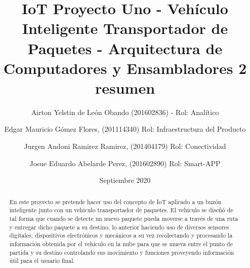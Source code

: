 \documentclass[osajnl,twocolumn,showpacs,superscriptaddress,10pt]{revtex4-1}
\begin{document}

\title{\Huge IoT Proyecto Uno -  Vehículo Inteligente Transportador de Paquetes  - Arquitectura de Computadores y Ensambladores 2 }

\author{\newline Airton Yelstin de León Obando (201602836) - Rol: Analítico}
%

\author{\newline Edgar Mauricio Gómez Flores, (201114340) Rol: Infraestructura del Producto}%
%
\author{\newline Jurgen Andoni Ramirez Ramirez, (201404179) Rol: Conectividad}%
%
\author{\newline Josue Eduardo Abelarde Perez, (201602890) Rol: Smart-APP}%
%
\date{Septiembre 2020}



\begin{abstract}
\title {resumen}
En este proyecto se pretende hacer uso del concepto de IoT aplicado a un buzón inteligente junto con un vehículo transportador de paquetes. El vehículo se diseñó de tal forma que cuando se detecte un nuevo paquete pueda moverse a través de una ruta y entregar dicho paquete a su destino, lo anterior haciendo uso de diversos sensores digitales, dispositivos electrónicos y mecánicos a su vez recolectando y procesando la información obtenida por el vehículo en la nube para que se mueva entre el punto de partida y su destino controlando sus movimiento y funciones proveyendo información útil para el usuario final.
\end{abstract}
\maketitle{}
\end{document}

